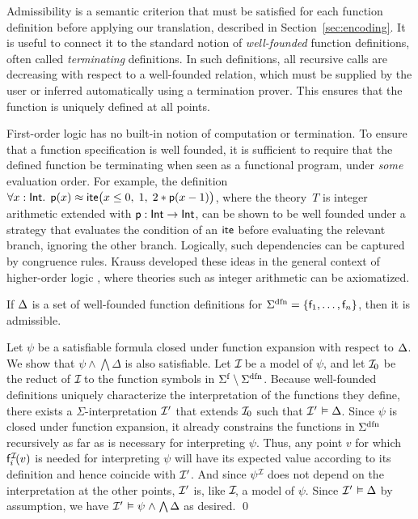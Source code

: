 Admissibility is a semantic criterion that must be satisfied for each function
definition before applying our translation, described in
Section~\ref{sec:encoding}. It is useful to connect it to the
standard notion of \emph{well-founded} function definitions, often called
\emph{terminating} definitions. %
In such definitions, all recursive calls are decreasing with respect to a well-founded
relation, which must be supplied by the user or inferred automatically
using a termination prover. This ensures that the function is uniquely defined
at all points.

First-order logic has no built-in notion of computation or termination. To ensure
that a function specification is well founded, it is sufficient to require that
the defined function be terminating when seen as a functional program, under \emph{some}
evaluation order. For example, the definition
$\forall x : {\mathsf{Int}}.\;\,
\mathsf{p}( x ) \approx \mathsf{ite}\bigl( x \leq 0,\allowbreak\;  1,\allowbreak\;
  2 * \mathsf{p}( x - 1 ) \bigr)$,
where the theory~$T$ is integer arithmetic extended with %
$\mathsf{p}:\mathsf{Int} \rightarrow \mathsf{Int}$, can be shown to be well founded
under a strategy that
evaluates the condition of an $\mathsf{ite}$ before evaluating the relevant branch,
ignoring the other branch. Logically, such dependencies can be captured by
congruence rules. Krauss developed these ideas in the general context of
higher-order logic \cite[Section 2]{krauss-2009-phd}, where theories such as
integer arithmetic can be axiomatized.

\begin{theorem}\label{thm:adm}
If $\DDD$ is a set of well-founded function definitions for\/
$\sfundefs{\Sigma} = \{\con{f}_1,\dotsc,\con{f}_n\}$, then it is admissible.
\end{theorem}

\begin{proofsketch}
Let $\psi$ be a satisfiable formula closed under function expansion with
respect to $\DDD$. We show that $\psi \wedge \bigwedge \Delta$ is also
satisfiable. Let $\mathcal{I\!}$ be a model of $\psi$, and
let $\mathcal{I\!}_0$ be the reduct of $\mathcal{I\!}$ to the function symbols in $\sfuns{\Sigma} \setminus
\sfundefs{\Sigma}$. Because well-founded definitions uniquely characterize
the interpretation of the functions they define, there exists a
$\Sigma$-interpretation ${\mathcal{I}'}$ that extends $\mathcal{I\!}_0$ such that $\J \models \Delta$.
%
Since $\psi$ is closed under function expansion, it already constrains the
functions in $\sfundefs{\Sigma}$ recursively as far as is
necessary for interpreting $\psi$. Thus, any point $v$ for which
$\mathsf{f}_i^{\mathcal{I\!}}(v)$ is needed for interpreting $\psi$ will have its
expected value according to its definition and hence coincide with ${\mathcal{I}'}$.
And since $\psi^{\mathcal{I\!}}$ does not depend on the interpretation at the other
points, ${\mathcal{I}'}$ is, like $\mathcal{I\!}$, a model of $\psi$.
Since $\J \models \Delta$ by assumption, we have $\J \models \psi \wedge
\bigwedge \Delta$ as desired.
\qed
\end{proofsketch}

